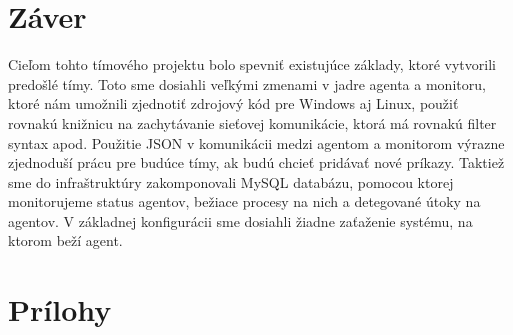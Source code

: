\documentclass[a4paper,12pt]{article}
\begin{document}
\section*{Záver}
Cieľom tohto tímového projektu bolo spevniť existujúce základy, ktoré vytvorili predošlé tímy. Toto sme dosiahli veľkými zmenami v jadre agenta a monitoru, ktoré nám umožnili zjednotiť zdrojový kód pre Windows aj Linux, použiť rovnakú knižnicu na zachytávanie sieťovej komunikácie, ktorá má rovnakú filter syntax apod. Použitie JSON v komunikácii medzi agentom a monitorom výrazne zjednoduší prácu pre budúce tímy, ak budú chcieť pridávať nové príkazy. Taktiež sme do infraštruktúry zakomponovali MySQL databázu, pomocou ktorej monitorujeme status agentov, bežiace procesy na nich a detegované útoky na agentov. V základnej konfigurácii sme dosiahli žiadne zaťaženie systému, na ktorom beží agent. \\
\newpage

\section*{Prílohy}
\end{document}
